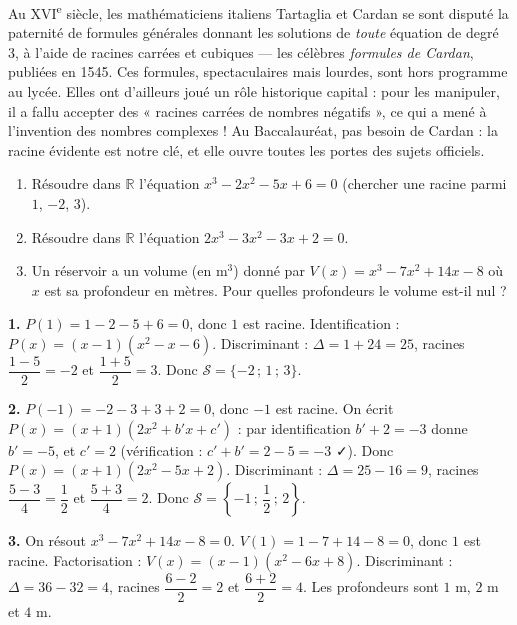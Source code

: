 \documentclass[11pt]{article}
\newcommand{\cle}[1]{{\popxbold\color{popdark}#1}}
\begin{document}
\begin{savaistu}
Au XVI\textsuperscript{e} siècle, les mathématiciens italiens Tartaglia et Cardan se sont disputé la paternité de formules générales donnant les solutions de \emph{toute} équation de degré 3, à l'aide de racines carrées et cubiques — les célèbres \emph{formules de Cardan}, publiées en 1545. Ces formules, spectaculaires mais lourdes, sont hors programme au lycée. Elles ont d'ailleurs joué un rôle historique capital : pour les manipuler, il a fallu accepter des « racines carrées de nombres négatifs », ce qui a mené à l'invention des nombres complexes ! Au Baccalauréat, pas besoin de Cardan : la \cle{racine évidente} est notre clé, et elle ouvre toutes les portes des sujets officiels.
\end{savaistu}

\begin{exercice}
\begin{enumerate}
\item Résoudre dans $\mathbb{R}$ l'équation $x^3 - 2x^2 - 5x + 6 = 0$ (chercher une racine parmi $1$, $-2$, $3$).
\item Résoudre dans $\mathbb{R}$ l'équation $2x^3 - 3x^2 - 3x + 2 = 0$.
\item Un réservoir a un volume (en m$^3$) donné par $V(x) = x^3 - 7x^2 + 14x - 8$ où $x$ est sa profondeur en mètres. Pour quelles profondeurs le volume est-il nul ?
\end{enumerate}
\end{exercice}

\begin{corrige}[Exercice]
\textbf{1.} $P(1) = 1 - 2 - 5 + 6 = 0$, donc $1$ est racine. Identification : $P(x) = (x-1)(x^2 - x - 6)$. Discriminant : $\Delta = 1 + 24 = 25$, racines $\dfrac{1-5}{2} = -2$ et $\dfrac{1+5}{2} = 3$. Donc $\mathcal{S} = \{-2 \,;\, 1 \,;\, 3\}$.

\textbf{2.} $P(-1) = -2 - 3 + 3 + 2 = 0$, donc $-1$ est racine. On écrit $P(x) = (x+1)(2x^2 + b'x + c')$ : par identification $b' + 2 = -3$ donne $b' = -5$, et $c' = 2$ (vérification : $c' + b' = 2 - 5 = -3$ ✓). Donc $P(x) = (x+1)(2x^2 - 5x + 2)$. Discriminant : $\Delta = 25 - 16 = 9$, racines $\dfrac{5-3}{4} = \dfrac{1}{2}$ et $\dfrac{5+3}{4} = 2$. Donc $\mathcal{S} = \left\{-1 \,;\, \dfrac{1}{2} \,;\, 2\right\}$.

\textbf{3.} On résout $x^3 - 7x^2 + 14x - 8 = 0$. $V(1) = 1 - 7 + 14 - 8 = 0$, donc $1$ est racine. Factorisation : $V(x) = (x-1)(x^2 - 6x + 8)$. Discriminant : $\Delta = 36 - 32 = 4$, racines $\dfrac{6-2}{2} = 2$ et $\dfrac{6+2}{2} = 4$. Les profondeurs sont $1$ m, $2$ m et $4$ m.
\end{corrige}
\end{document}
